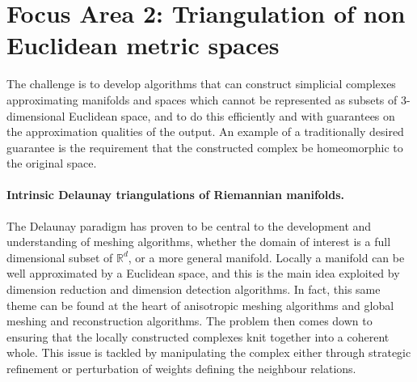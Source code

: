 %

\newcommand{\man}{\mathcal{M}}
\newcommand{\reel}{\mathbb{R}}
\newcommand{\rdee}{\reel^d}
\renewcommand{\pts}{P}
\newcommand{\mesh}{\hat{M}}

\newcommand{\ramsay}[1]{\framebox{#1}}%

\section*{Focus Area 2: Triangulation of non Euclidean metric spaces}

The challenge is to develop algorithms that can construct simplicial
complexes approximating manifolds and spaces which cannot be
represented as subsets of 3-dimensional Euclidean space, and to do
this efficiently and with guarantees on the approximation qualities of
the output.
%
An example of a traditionally desired guarantee is the requirement
that the constructed complex be homeomorphic to the original space.

\paragraph{Intrinsic Delaunay triangulations of Riemannian manifolds.}

The Delaunay paradigm has proven to be central to the development and
understanding of meshing algorithms, whether the domain of interest is
a full dimensional subset of $\rdee$, or a more general manifold. 
%
Locally a manifold can be well approximated by a Euclidean space, and
this is the main idea exploited by dimension reduction and dimension
detection algorithms. In fact, this same theme can be found at the
heart of anisotropic meshing algorithms and global meshing and
reconstruction algorithms. The problem then comes down to ensuring
that the locally constructed complexes knit together into a coherent
whole. This issue is tackled by manipulating the complex either
through strategic refinement or perturbation of weights defining the
neighbour relations. 

